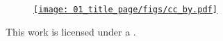 \begin{titlepage}
  \vspace{\fill}

  \begin{center}
    \begin{figure}[h]
      \centering
      \href{\TheLicenseLink}{\texttt{[image: 
          01\_title\_page/figs/cc\_by.pdf]}}
    \end{figure}

    This work is licensed under a \href{\TheLicenseLink}{\TheLicense{}}.
  \end{center}
\end{titlepage}
